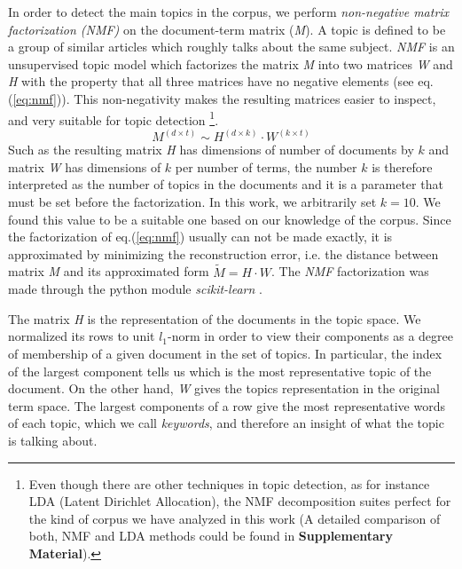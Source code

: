 \documentclass{bmcart}
\begin{document}
\par In order to detect the main topics in the corpus, we perform \emph{non-negative matrix factorization (NMF)} \cite{xu2003document, lee1999learning} on the document-term matrix (\emph{M}). A topic is defined to be a group of similar articles which roughly talks about the same subject. 
\emph{NMF} is an unsupervised topic model which factorizes the matrix \emph{M} into two matrices \emph{W} and \emph{H} with the property that all three matrices have no negative elements (see eq.(\ref{eq:nmf})).
This non-negativity makes the resulting matrices easier to inspect, and very suitable for topic detection \footnote{ Even though there are other techniques in topic detection, as for instance LDA (Latent Dirichlet Allocation), the NMF decomposition suites perfect for the kind of corpus we  have analyzed in this work (A detailed comparison of both, NMF and LDA methods could be found in \textbf{Supplementary Material}).}. 
\begin{equation}
M^{(d \times t)} \sim H^{(d \times k)} \cdot W^{(k \times t)}
\label{eq:nmf}
\end{equation}
Such as the resulting matrix \emph{H} has dimensions of number of documents by $k$ and matrix \emph{W} has dimensions of $k$ per number of terms, the number $k$ is therefore interpreted as the number of topics in the documents and it is a parameter that must be set before the factorization.
In this work, we arbitrarily set $k=10$. We found this value to be a suitable one based on our knowledge of the corpus.
Since the factorization of eq.(\ref{eq:nmf}) usually can not be made exactly, it is approximated by minimizing the reconstruction error, i.e. the distance between matrix \emph{M} and its approximated form $\tilde{M} = H \cdot W$. The \emph{NMF} factorization was made through the python module \emph{scikit-learn} \cite{scikit-learn}.


\par The matrix \emph{H} is the representation of the documents in the topic space. We normalized its rows to unit $l_1$-norm in order to view their components as a degree of membership of a given document in the set of topics. In particular, the index of the largest component tells us which is the most representative topic of the document.
On the other hand, \emph{W} gives the topics representation in the original term space. The largest components of a row give the most representative words of each topic, which we call \emph{keywords}, and therefore an insight of what the topic is talking about.
\end{document}
